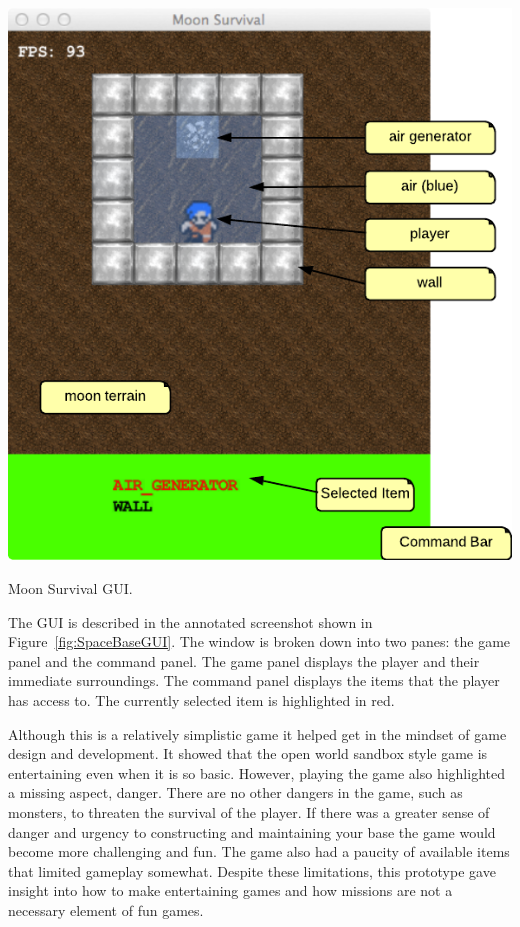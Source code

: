 \begin{marginfigure}
	\includegraphics{res/space_base_prototype/MoonSurvivalGUI.pdf}
	\caption[Moon Survival GUI]{Moon Survival GUI.}
	\label{fig:SpaceBaseGUI}
\end{marginfigure}

The GUI is described in the annotated screenshot shown in Figure~\ref{fig:SpaceBaseGUI}. The window is broken down into two panes: the game panel and the command panel. The game panel displays the player and their immediate surroundings. The command panel displays the items that the player has access to. The currently selected item is highlighted in red.

Although this is a relatively simplistic game it helped get in the mindset of game design and development. It showed that the open world sandbox style game is entertaining even when it is so basic. However, playing the game also highlighted a missing aspect, danger. There are no other dangers in the game, such as monsters, to threaten the survival of the player. If there was a greater sense of danger and urgency to constructing and maintaining your base the game would become more challenging and fun. The game also had a paucity of available items that limited gameplay somewhat. Despite these limitations, this prototype gave insight into how to make entertaining games and how missions are not a necessary element of fun games. 
